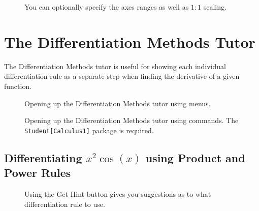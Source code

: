 \begin{figure}[h]
\caption{You can optionally specify the axes ranges as well as $1:1$ scaling.}
\centering
{}
\end{figure}

\section{The Differentiation Methods Tutor}

The Differentiation Methods tutor is useful for showing each individual differentiation rule as a separate step when finding the derivative of a given function.

\begin{figure}[h]
\caption{Opening up the Differentiation Methods tutor using menus.}
\centering
{}
\end{figure}

\begin{figure}[h]
\caption{Opening up the Differentiation Methods tutor using commands. The \texttt{Student[Calculus1]} package is required.}
\centering
{}
\end{figure}

\clearpage

\subsection{Differentiating $x^2\cos(x)$ using Product and Power Rules}

\begin{figure}[h]
\caption{Using the Get Hint button gives you suggestions as to what differentiation rule to use.}
\centering
{}
\end{figure}


